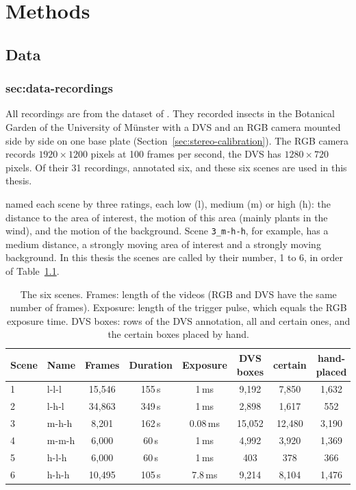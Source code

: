 \chapter{Methods}
\label{ch:methods}

\section{Data}
\label{sec:data}

\subsection{sec:data-recordings}

All recordings are from the dataset of \textcite{gebauer_towards_2024}. They recorded
insects in the Botanical Garden of the University of Münster with a DVS and an RGB camera
mounted side by side on one base plate (Section~\ref{sec:stereo-calibration}). The RGB camera
records $1920 \times 1200$ pixels at 100 frames per second, the DVS has $1280 \times 720$
pixels. Of their 31 recordings, \textcite{gebauer_towards_2024} annotated six, and 
these six scenes are used in this thesis.

\textcite{gebauer_towards_2024} named each scene by three ratings, each low (l), medium (m)
or high (h): the distance to the area of interest, the motion of this area (mainly plants
in the wind), and the motion of the background. Scene \texttt{3\_m-h-h}, for example, has a
medium distance, a strongly moving area of interest and a strongly moving background. In 
this thesis the scenes are called by their number, 1 to 6, in order of Table~\ref{tab:data-scenes}.

\begin{table}[ht]
    \centering
    \caption{The six scenes. Frames: length of the videos (RGB and DVS have the
    same number of frames). Exposure: length of the trigger pulse, which equals the
    RGB exposure time. DVS boxes: rows of the DVS annotation, all and certain ones,
    and the certain boxes placed by hand.}
    \label{tab:data-scenes}
    \small
    \begin{tabular}{llcccccc}
        \hline
        Scene & Name & Frames & Duration & Exposure & DVS boxes & certain & hand-placed \\
        \hline
        1 & l-l-l & 15,546 & 155\,s & 1\,ms & 9,192 & 7,850 & 1,632 \\
        2 & l-h-l & 34,863 & 349\,s & 1\,ms & 2,898 & 1,617 & 552 \\
        3 & m-h-h & 8,201 & 162\,s & 0.08\,ms & 15,052 & 12,480 & 3,190 \\
        4 & m-m-h & 6,000 & 60\,s & 1\,ms & 4,992 & 3,920 & 1,369 \\
        5 & h-l-h & 6,000 & 60\,s & 1\,ms & 403 & 378 & 366 \\
        6 & h-h-h & 10,495 & 105\,s & 7.8\,ms & 9,214 & 8,104 & 1,476 \\
        \hline
    \end{tabular}
\end{table}

